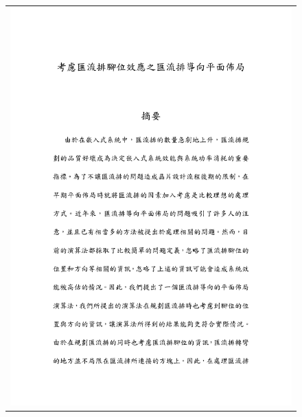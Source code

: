 \documentclass[12pt, a4paper]{report}
\begin{document}
%
%
\begin{figure}[h]
\centering
\vspace{-29mm}
\begin{tabular}{c}
\hspace{-36mm} \includegraphics[]{./abstract/ChineseAbstract1.pdf}
\end{tabular}
\end{figure}
\newpage
\newpage
\end{document}
